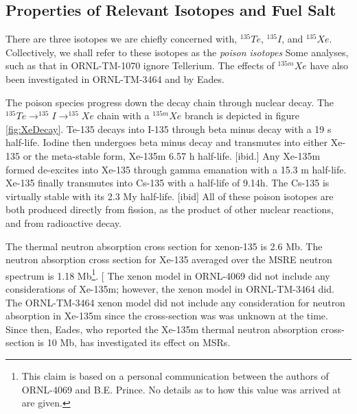 \subsection{Properties of Relevant Isotopes and Fuel Salt}
\label{sec:fuelSaltProperties}
There are three isotopes we are chiefly concerned with, $^{135}Te$, $^{135}I$, and $^{135}Xe$.  Collectively, we shall refer to these isotopes as the \textit{poison isotopes} Some analyses, such as that in ORNL-TM-1070 ignore Tellerium.  The effects of $^{135m}Xe$ have also been investigated in ORNL-TM-3464 and by Eades.\cite{ORNLTM3464,Eades16}  

The poison species progress down the decay chain through nuclear decay. The $^{135}Te \rightarrow ^{135}I \rightarrow ^{135}Xe$ chain with a $^{135m}Xe$ branch is depicted in figure \ref{fig:XeDecay}.  Te-135 decays into I-135 through beta minus decay with a 19 s half-life. \cite[p. 56]{Baum2010}  Iodine then undergoes beta minus decay and transmutes into either Xe-135 or the meta-stable form, Xe-135m  6.57 h half-life. [ibid.] Any Xe-135m formed de-excites into Xe-135 through gamma emanation with a 15.3 m half-life. \cite[p. 298]{Eades16} Xe-135 finally transmutes into Cs-135 with a half-life of 9.14h.\cite[p. 56]{Baum2010} The Cs-135 is virtually stable with its 2.3 My half-life. [ibid]  All of these poison isotopes are both produced directly from fission, as the product of other nuclear reactions, and from radioactive decay.

The thermal neutron absorption cross section for xenon-135 is 2.6 Mb. \cite[p. 54-9]{Mughab12P1} The neutron absorption cross section for Xe-135 averaged over the MSRE neutron spectrum is 1.18 Mb\footnote{This claim is based on a personal communication between the authors of ORNL-4069 and B.E. Prince.  No details as to how this value was arrived at are given.}.\cite[p. 42]{ORNL4069} [ The xenon model in ORNL-4069 did not include any considerations of Xe-135m; however, the xenon model in ORNL-TM-3464 did. The ORNL-TM-3464 xenon model did not include any consideration for neutron absorption in Xe-135m since the cross-section was was unknown at the time. \cite[p. 3]{ORNLTM3464}  Since then, Eades, who reported the Xe-135m thermal neutron absorption cross-section is 10 Mb, has investigated its effect on MSRs.\cite{Eades16}

